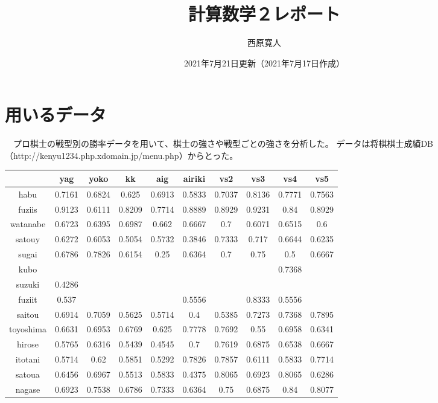 \documentclass[11pt,a4paper,dvipdfmx]{jsarticle}
\title{計算数学２レポート}
\author{西原寛人}
\date{2021年7月21日更新（2021年7月17日作成）}
\begin{document}
\maketitle
%
%
%
%
%
\section{用いるデータ}
　プロ棋士の戦型別の勝率データを用いて、棋士の強さや戦型ごとの強さを分析した。
データは将棋棋士成績DB（http://kenyu1234.php.xdomain.jp/menu.php）からとった。
\\
\begin{tabular}{c||c|c|c|c|c|c|c|c|c} 
    & yag & yoko & kk & aig & airiki & vs2 & vs3 & vs4 & vs5 \\ \hline
    habu & 0.7161 & 0.6824 & 0.625 & 0.6913 & 0.5833 & 0.7037 & 0.8136 & 0.7771 & 0.7563 \\
    fuziis & 0.9123 & 0.6111 & 0.8209 & 0.7714 & 0.8889 & 0.8929 & 0.9231 & 0.84 & 0.8929 \\
    watanabe & 0.6723 & 0.6395 & 0.6987 & 0.662 & 0.6667 & 0.7 & 0.6071 & 0.6515 & 0.6 \\
    satouy & 0.6272 & 0.6053 & 0.5054 & 0.5732 & 0.3846 & 0.7333 & 0.717 & 0.6644 & 0.6235 \\
    sugai & 0.6786 & 0.7826 & 0.6154 & 0.25 & 0.6364 & 0.7 & 0.75 & 0.5 & 0.6667 \\
    kubo &  &  &  &  &  &  &  & 0.7368 &  \\
    suzuki & 0.4286 &  &  &  &  &  &  &  &  \\
    fuziit & 0.537 &  &  &  & 0.5556 &  & 0.8333 & 0.5556 &  \\
    saitou & 0.6914 & 0.7059 & 0.5625 & 0.5714 & 0.4 & 0.5385 & 0.7273 & 0.7368 & 0.7895 \\
    toyoshima & 0.6631 & 0.6953 & 0.6769 & 0.625 & 0.7778 & 0.7692 & 0.55 & 0.6958 & 0.6341 \\
    hirose & 0.5765 & 0.6316 & 0.5439 & 0.4545 & 0.7 & 0.7619 & 0.6875 & 0.6538 & 0.6667 \\
    itotani & 0.5714 & 0.62 & 0.5851 & 0.5292 & 0.7826 & 0.7857 & 0.6111 & 0.5833 & 0.7714 \\
    satoua & 0.6456 & 0.6967 & 0.5513 & 0.5833 & 0.4375 & 0.8065 & 0.6923 & 0.8065 & 0.6286 \\
    nagase & 0.6923 & 0.7538 & 0.6786 & 0.7333 & 0.6364 & 0.75 & 0.6875 & 0.84 & 0.8077 \\

\end{tabular}
\end{document}
